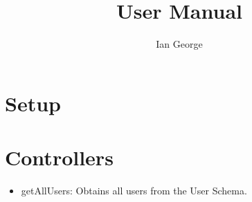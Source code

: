 \documentclass[letterpaper, 10 pt]{report}
\begin{document}
\title{User Manual}
\author{Ian George}
\maketitle
\pagestyle{empty}

\tableofcontents
\newpage

\section{Setup}


\newpage

\section{Controllers}
\begin{itemize}
 \item getAllUsers: Obtains all users from the User Schema.
\end{itemize}
\newpage
%

\end{document}
